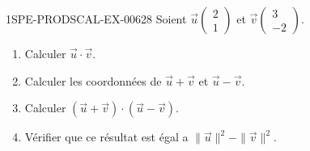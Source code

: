 \begin{exercice}{1SPE-PRODSCAL-EX-006}{2}{8}
Soient $\vec{u}\begin{pmatrix} 2 \\ 1 \end{pmatrix}$ et $\vec{v}\begin{pmatrix} 3 \\ -2 \end{pmatrix}$.
\begin{enumerate}
  \item Calculer $\vec{u} \cdot \vec{v}$.
  \item Calculer les coordonnées de $\vec{u} + \vec{v}$ et $\vec{u} - \vec{v}$.
  \item Calculer $(\vec{u} + \vec{v}) \cdot (\vec{u} - \vec{v})$.
  \item Vérifier que ce résultat est égal a $\|\vec{u}\|^2 - \|\vec{v}\|^2$.
\end{enumerate}
\end{exercice}
